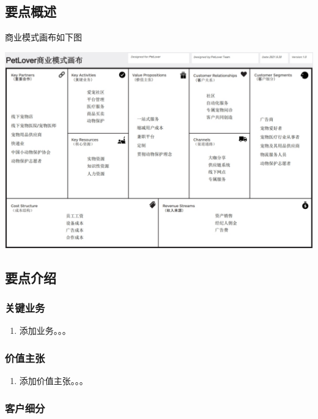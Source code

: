 \documentclass[a4paper]{ctexart}
\begin{document}
\subsection{要点概述}

商业模式画布如下图

\begin{center}
  \includegraphics[width=16cm]{the-business-model-canvas}
\end{center}

\subsection{要点介绍}

\subsubsection{关键业务}

\begin{enumerate}[label=\alph*.]
  \item 添加业务。。。
\end{enumerate}

\subsubsection{价值主张}

\begin{enumerate}[label=\alph*.]
  \item 添加价值主张。。。
\end{enumerate}

\subsubsection{客户细分}
\end{document}
